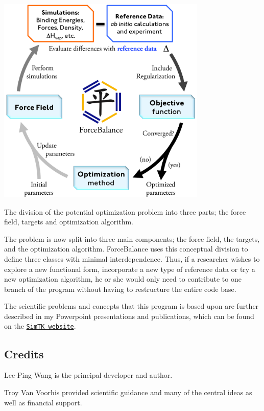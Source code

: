 \begin{DoxyImage}
\includegraphics[height=10cm]{cycle.png}
\caption{\-The division of the potential optimization problem into three parts; the force field, targets and optimization algorithm.}
\end{DoxyImage}


\-The problem is now split into three main components; the force field, the targets, and the optimization algorithm. \-Force\-Balance uses this conceptual division to define three classes with minimal interdependence. \-Thus, if a researcher wishes to explore a new functional form, incorporate a new type of reference data or try a new optimization algorithm, he or she would only need to contribute to one branch of the program without having to restructure the entire code base.

\-The scientific problems and concepts that this program is based upon are further described in my \-Powerpoint presentations and publications, which can be found on the \href{https://simtk.org/home/forcebalance/}{\tt \-Sim\-T\-K website}.\hypertarget{index_credits}{}\subsection{\-Credits}\label{index_credits}

\begin{DoxyItemize}
\item \-Lee-\/\-Ping \-Wang is the principal developer and author.
\end{DoxyItemize}


\begin{DoxyItemize}
\item \-Troy \-Van \-Voorhis provided scientific guidance and many of the central ideas as well as financial support.
\end{DoxyItemize}


